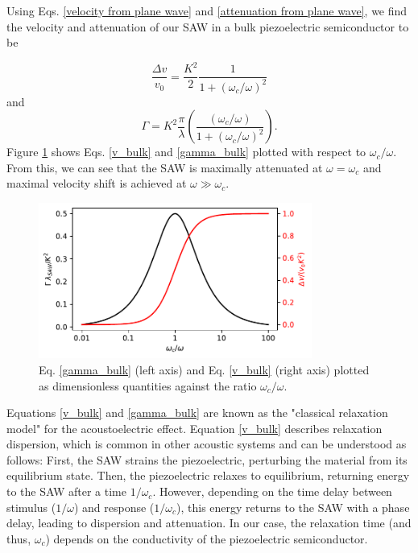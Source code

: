 \documentclass[double,12pt,1in]{beavtex}
\begin{document}
Using Eqs. \ref{velocity from plane wave} and \ref{attenuation from plane wave}, we find the velocity and attenuation of our SAW in a bulk piezoelectric semiconductor to be

\begin{equation}
    \frac{\Delta v}{v_0} = \frac{K^2}{2}\frac{1}{1+(\omega_c/\omega)^2} \label{v_bulk}
\end{equation}
and
\begin{equation}
    \Gamma = K^2 \frac{\pi}{\lambda}\left(\frac{(\omega_c/\omega)}{1+(\omega_c/\omega)^2}\right). \label{gamma_bulk}
\end{equation}
Figure \ref{gamma_and_v} shows Eqs. \ref{v_bulk} and \ref{gamma_bulk} plotted with respect to  $\omega_c/\omega$. From this, we can see that the SAW is maximally attenuated at $\omega = \omega_c$ and maximal velocity shift is achieved at $\omega \gg \omega_c$.

\begin{figure}
    \includegraphics[width=0.8\textwidth]{gamma_and_v.pdf}
    \caption{Eq. \ref{gamma_bulk} (left axis) and Eq. \ref{v_bulk} (right axis) plotted as dimensionless quantities against the ratio $\omega_c/\omega$.}
    \label{gamma_and_v}
\end{figure}
Equations \ref{v_bulk} and \ref{gamma_bulk} are known as the "classical relaxation model" for the acoustoelectric effect. Equation \ref{v_bulk} describes relaxation dispersion, which is common in other acoustic systems \cite{hutson_elastic_1962, rudenko_dispersive_2022} and can be understood as follows: First, the SAW strains the piezoelectric, perturbing the material from its equilibrium state. Then, the piezoelectric relaxes to equilibrium, returning energy to the SAW after a time $1/\omega_c$. However, depending on the time delay between stimulus ($1/\omega$) and response ($1/\omega_c$), this energy returns to the SAW with a phase delay, leading to dispersion and attenuation. In our case, the relaxation time (and thus, $\omega_c$) depends on the conductivity of the piezoelectric semiconductor. 
\end{document}
